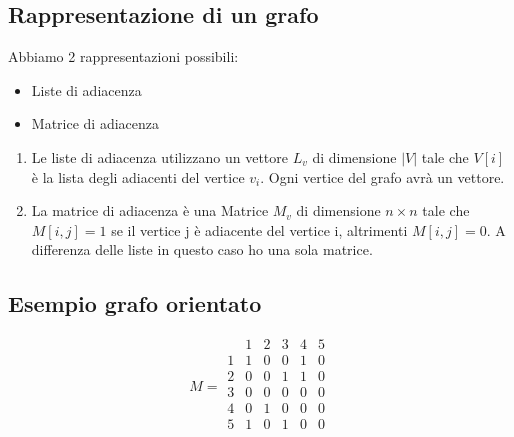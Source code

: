 \subsection{Rappresentazione di un grafo}
Abbiamo 2 rappresentazioni possibili:
\begin{itemize}
    \item Liste di adiacenza
    \item Matrice di adiacenza
\end{itemize}
\begin{enumerate}
    \item Le liste di adiacenza utilizzano un vettore $L_v$ di dimensione $|V|$ tale che $V[i]$ è la lista degli
    adiacenti del vertice $v_i$. Ogni vertice del grafo avrà un vettore.
    \item La matrice di adiacenza è una Matrice $M_v$ di dimensione $n \times n$ tale che $M[i,j] = 1$ se il
    vertice j è adiacente del vertice i, altrimenti $M[i,j] = 0$. A differenza delle liste in questo caso ho una sola
    matrice.
\end{enumerate}
\subsection{Esempio grafo orientato}
\begin{center}
\end{center}

\begin{equation*}
    M = \begin{array}{c|ccccc}
    & 1 & 2 & 3 & 4 & 5 \\
    \hline
    1 & 1 & 0 & 0 & 1 & 0 \\
    2 & 0 & 0 & 1 & 1 & 0 \\
    3 & 0 & 0 & 0 & 0 & 0 \\
    4 & 0 & 1 & 0 & 0 & 0 \\
    5 & 1 & 0 & 1 & 0 & 0 \\
    \end{array}
\end{equation*}
